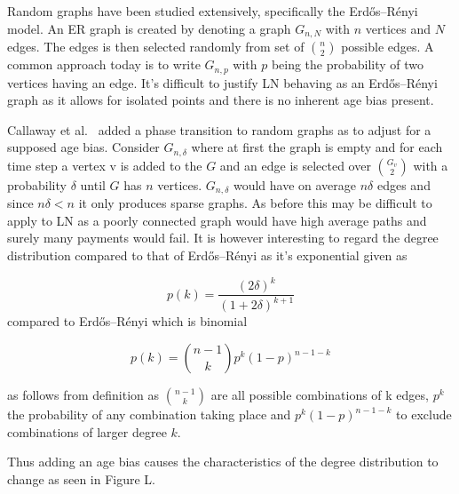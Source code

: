 Random graphs have been studied extensively, specifically the Erdős–Rényi model\cite{erdos:renyi:random:graphs}. An ER graph is created by denoting a graph $G_{n,N}$ with $n$ vertices and $N$ edges. The edges is then selected randomly from set of ${n \choose 2}$ possible edges. A common approach today is to write $G_{n,p}$ with $p$ being the probability of two vertices having an edge. It's difficult to justify LN behaving as an Erdős–Rényi graph as it allows for isolated points and there is no inherent age bias present. 

Callaway et al.~\cite{callaway:hopcraft:randomly:grown:graphs} added a phase transition to random graphs as to adjust for a supposed age bias. Consider $G_{n,\delta}$ where at first the graph is empty and for each time step a vertex v is added to the $G$ and an edge is selected over $G_v \choose 2$ with a probability $\delta$ until $G$ has $n$ vertices. $G_{n,\delta}$ would have on average $n\delta$ edges and since $n\delta < n$ it only produces sparse graphs. As before this may be difficult to apply to LN as a poorly connected graph would have high average paths and surely many payments would fail. It is however interesting to regard the degree distribution compared to that of Erdős–Rényi as it's exponential given as

\begin{equation}
	p(k) = \dfrac{(2\delta)^k}{(1 + 2\delta)^{k+1}} 
	\label{eq:callaway}
\end{equation}
compared to Erdős–Rényi which is binomial

\begin{equation}
	p(k) = {n-1 \choose k} p^k(1-p)^{n-1-k} 
	\label{eq:erdos:renyi}
\end{equation}

as follows from definition as ${n-1 \choose k}$ are all possible combinations of k edges,  $p^k$ the probability of any combination taking place and $p^k(1-p)^{n-1-k}$ to exclude combinations of larger degree $k$.

Thus adding an age bias causes the characteristics of the degree distribution to change as seen in Figure L.

